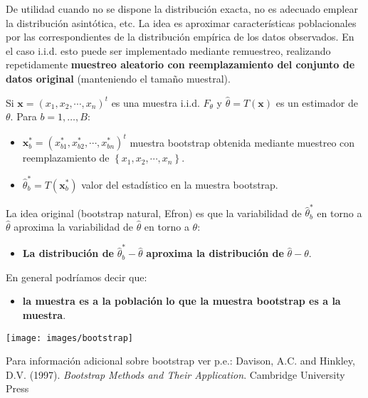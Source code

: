 \documentclass[
]{book}
\providecommand{\tightlist}{%
  \setlength{\itemsep}{0pt}\setlength{\parskip}{0pt}}
\theoremstyle{break}
\theoremstyle{definition}
\theoremstyle{definition}
\theoremstyle{definition}
\theoremstyle{remark}
\begin{document}
De utilidad cuando no se dispone la distribución exacta, no es
adecuado emplear la distribución asintótica, etc.
La idea es aproximar características poblacionales por las
correspondientes de la distribución empírica de los
datos observados.
En el caso i.i.d. esto puede ser implementado mediante remuestreo,
realizando repetidamente \textbf{muestreo aleatorio con reemplazamiento
del conjunto de datos original} (manteniendo el tamaño muestral).

Si \(\mathbf{x} = \left( x_{1},x_{2},\cdots ,x_{n}\right) ^{t}\) es una
muestra i.i.d. \(F_{\theta }\) y
\(\hat{\theta} = T\left( \mathbf{x} \right)\)
es un estimador de \(\theta\).
Para \(b = 1,\ldots ,B:\)

\begin{itemize}
\item
  \(\mathbf{x}_{b}^{\ast } = \left( x_{b1}^{\ast },x_{b2}^{\ast },\cdots ,x_{bn}^{\ast }\right) ^{t}\) muestra bootstrap obtenida mediante
  muestreo con reemplazamiento de
  \(\left\{ x_{1},x_{2},\cdots ,x_{n}\right\}\).
\item
  \(\hat{\theta}_{b}^{\ast } = T\left( \mathbf{x}_{b}^{\ast }\right)\)
  valor del estadístico en la muestra bootstrap.
\end{itemize}

La idea original (bootstrap natural, Efron) es que la variabilidad
de \(\hat{\theta}_{b}^{\ast }\) en torno a \(\hat{\theta}\) aproxima la
variabilidad de \(\hat{\theta}\) en torno a \(\theta\):

\begin{itemize}
\tightlist
\item
  \textbf{La distribución de} \(\hat{\theta}_{b}^{\ast }-\hat{\theta}\)
  \textbf{aproxima la distribución de} \(\hat{\theta}-\theta\).
\end{itemize}

En general podríamos decir que:

\begin{itemize}
\tightlist
\item
  \textbf{la muestra es a la población}
  \textbf{lo que la muestra bootstrap es a la muestra}.
\end{itemize}

\begin{center}\texttt{[image: images/bootstrap]} \end{center}

Para información adicional sobre bootstrap ver p.e.:
Davison, A.C. and Hinkley, D.V. (1997). \emph{Bootstrap Methods and Their Application}. Cambridge University Press
\end{document}
